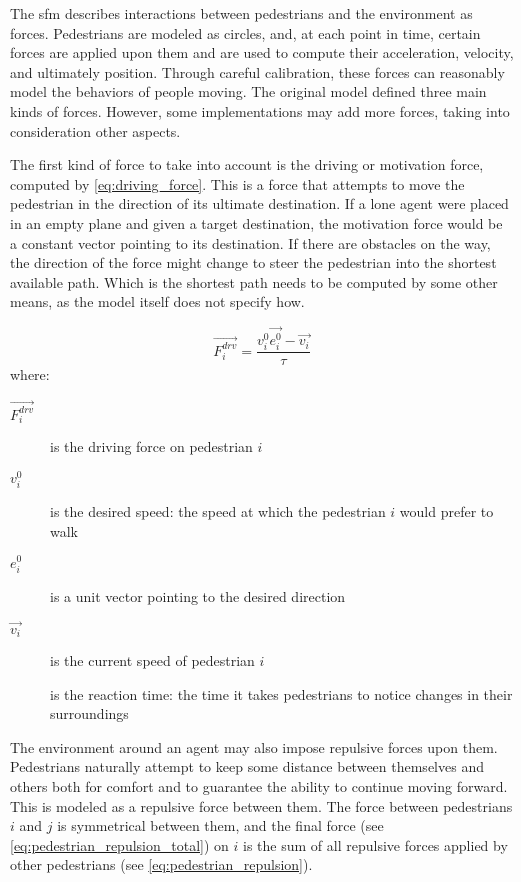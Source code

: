 \documentclass[twoside, 11pt]{article}
\begin{document}
The \gls{sfm} describes interactions between pedestrians and the environment as forces. Pedestrians are modeled as circles, and, at each point in time, certain forces are applied upon them and are used to compute their acceleration, velocity, and ultimately position. Through careful calibration, these forces can reasonably model the behaviors of people moving. The original model defined three main kinds of forces. However, some implementations may add more forces, taking into consideration other aspects.

The first kind of force to take into account is the driving or motivation force, computed by \autoref{eq:driving_force}. This is a force that attempts to move the pedestrian in the direction of its ultimate destination. If a lone agent were placed in an empty plane and given a target destination, the motivation force would be a constant vector pointing to its destination. If there are obstacles on the way, the direction of the force might change to steer the pedestrian into the shortest available path. Which is the shortest path needs to be computed by some other means, as the model itself does not specify how.

\begin{equation}
  \vec{F_i^{drv}} = \frac{v_i^0 \vec{e_i^0} - \vec{v_i}}{\tau}
  \label{eq:driving_force}
\end{equation}
where:
\begin{description}
  \item[$\vec{F_i^{drv}}$] is the driving force on pedestrian $i$
  \item[$v_i^0$] is the desired speed: the speed at which the pedestrian $i$ would prefer to walk
  \item[$e_i^0$] is a unit vector pointing to the desired direction
  \item[$\vec{v_i}$] is the current speed of pedestrian $i$
  \item[\tau] is the reaction time: the time it takes pedestrians to notice changes in their surroundings 
\end{description}

The environment around an agent may also impose repulsive forces upon them. Pedestrians naturally attempt to keep some distance between themselves and others both for comfort and to guarantee the ability to continue moving forward. This is modeled as a repulsive force between them. The force between pedestrians $i$ and $j$ is symmetrical between them, and the final force (see \autoref{eq:pedestrian_repulsion_total}) on $i$ is the sum of all repulsive forces applied by other pedestrians (see \autoref{eq:pedestrian_repulsion}).
\end{document}
